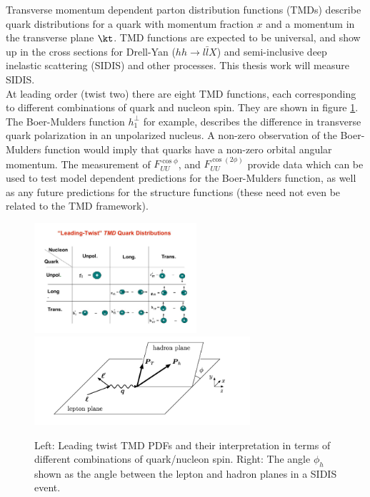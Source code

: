 Transverse momentum dependent parton distribution functions (TMDs) describe quark distributions for a quark with momentum fraction $x$ and a momentum in the transverse plane $\kt$.  TMD functions are expected to be universal, and show up in the cross sections for Drell-Yan ($hh \rightarrow l \bar{l}X$) and semi-inclusive deep inelastic scattering (SIDIS) and other processes.  This thesis work will measure SIDIS.  \\

At leading order (twist two) there are eight TMD functions, each corresponding to different combinations of quark and nucleon spin.  They are shown in figure \ref{fig:tmd-table}.  The Boer-Mulders function $h_{1}^{\perp}$ for example, describes the difference in transverse quark polarization in an unpolarized nucleus.  A non-zero observation of the Boer-Mulders function would imply that quarks have a non-zero orbital angular momentum.  The measurement of $F_{UU}^{\cos\phi}$, and $F_{UU}^{\cos(2\phi)}$ provide data which can be used to test model dependent predictions for the Boer-Mulders function, as well as any future predictions for the structure functions (these need not even be related to the TMD framework).  

\begin{figure}
  \centering
  \includegraphics[width=6cm]{image/TMD-table.jpg}
  \includegraphics[width=8cm]{image/PhiHadron.png}
  \caption{Left: Leading twist TMD PDFs and their interpretation in terms of different combinations of quark/nucleon spin. Right:  The angle $\phi_h$ shown as the angle between the lepton and hadron planes in a SIDIS event. }
  \label{fig:tmd-table}
 

\end{figure}

